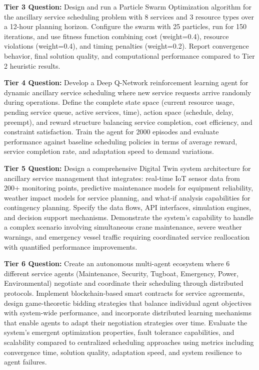 \documentclass{article}
\begin{document}
\textbf{Tier 3 Question:} Design and run a Particle Swarm Optimization algorithm for the ancillary service scheduling problem with 8 services and 3 resource types over a 12-hour planning horizon. Configure the swarm with 25 particles, run for 150 iterations, and use fitness function combining cost (weight=0.4), resource violations (weight=0.4), and timing penalties (weight=0.2). Report convergence behavior, final solution quality, and computational performance compared to Tier 2 heuristic results.

\textbf{Tier 4 Question:} Develop a Deep Q-Network reinforcement learning agent for dynamic ancillary service scheduling where new service requests arrive randomly during operations. Define the complete state space (current resource usage, pending service queue, active services, time), action space (schedule, delay, preempt), and reward structure balancing service completion, cost efficiency, and constraint satisfaction. Train the agent for 2000 episodes and evaluate performance against baseline scheduling policies in terms of average reward, service completion rate, and adaptation speed to demand variations.

\textbf{Tier 5 Question:} Design a comprehensive Digital Twin system architecture for ancillary service management that integrates: real-time IoT sensor data from 200+ monitoring points, predictive maintenance models for equipment reliability, weather impact models for service planning, and what-if analysis capabilities for contingency planning. Specify the data flows, API interfaces, simulation engines, and decision support mechanisms. Demonstrate the system's capability to handle a complex scenario involving simultaneous crane maintenance, severe weather warnings, and emergency vessel traffic requiring coordinated service reallocation with quantified performance improvements.

\textbf{Tier 6 Question:} Create an autonomous multi-agent ecosystem where 6 different service agents (Maintenance, Security, Tugboat, Emergency, Power, Environmental) negotiate and coordinate their scheduling through distributed protocols. Implement blockchain-based smart contracts for service agreements, design game-theoretic bidding strategies that balance individual agent objectives with system-wide performance, and incorporate distributed learning mechanisms that enable agents to adapt their negotiation strategies over time. Evaluate the system's emergent optimization properties, fault tolerance capabilities, and scalability compared to centralized scheduling approaches using metrics including convergence time, solution quality, adaptation speed, and system resilience to agent failures.
\end{document}
